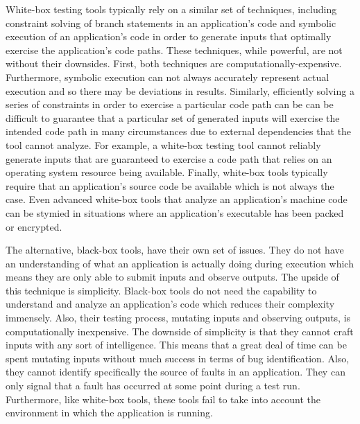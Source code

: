     White-box testing tools typically rely on a similar set of techniques, including constraint solving of branch
    statements in an application's code and symbolic execution of an application's code in order to generate inputs
    that optimally exercise the application's code paths. These techniques, while powerful, are not without their
    downsides. First, both techniques are computationally-expensive. Furthermore, symbolic execution can not always
    accurately represent actual execution and so there may be deviations in results. Similarly, efficiently solving
    a series of constraints in order to exercise a particular code path can be can be difficult to guarantee that a
    particular set of generated inputs will exercise the intended code path in many circumstances due to external
    dependencies that the tool cannot analyze. For example, a white-box testing tool cannot reliably generate inputs
    that are guaranteed to exercise a code path that relies on an operating system resource being available.
    Finally, white-box tools typically require that an application's source code be available which is not always
    the case. Even advanced white-box tools that analyze an application's machine code can be stymied in situations
    where an application's executable has been packed or encrypted.

    The alternative, black-box tools, have their own set of issues. They do not have an understanding of what an
    application is actually doing during execution which means they are only able to submit inputs and observe
    outputs.  The upside of this technique is simplicity. Black-box tools do not need the capability to understand
    and analyze an application's code which reduces their complexity immensely. Also, their testing process,
    mutating inputs and observing outputs, is computationally inexpensive. The downside of simplicity is that they
    cannot craft inputs with any sort of intelligence. This means that a great deal of time can be spent mutating
    inputs without much success in terms of bug identification. Also, they cannot identify specifically the source
    of faults in an application. They can only signal that a fault has occurred at some point during a test run.
    Furthermore, like white-box tools, these tools fail to take into account the environment in which the
    application is running.